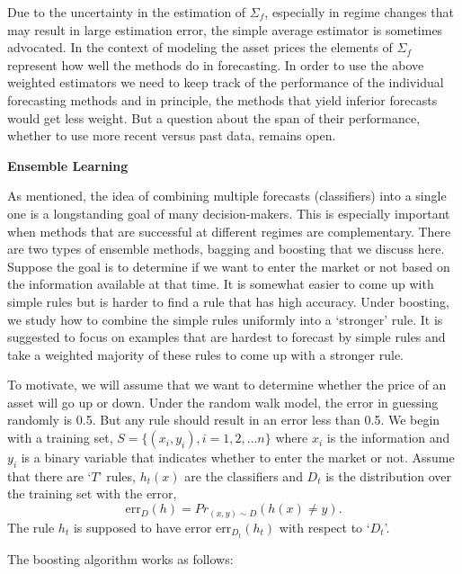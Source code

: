 \noindent Due to the uncertainty in the estimation of $\Sigma_f$, especially in regime changes that may result in large estimation error, the simple average estimator is sometimes advocated. In the context of modeling the asset prices the elements of $\Sigma_f$ represent how well the methods do in forecasting. In order to use the above weighted estimators we need to keep track of the performance of the individual forecasting methods and in principle, the methods that yield inferior forecasts would get less weight. But a question about the span of their performance, whether to use more recent versus past data, remains open. \twomedskip


\noindent \textbf{Ensemble Learning} \twomedskip


As mentioned, the idea of combining multiple forecasts (classifiers) into a single one is a longstanding goal of many decision-makers. This is especially important when methods that are successful at different regimes are complementary. There are two types of ensemble methods, bagging and boosting that we discuss here. Suppose the goal is to determine if we want to enter the market or not based on the information available at that time. It is somewhat easier to come up with simple rules but is harder to find a rule that has high accuracy. Under boosting, we study how to combine the simple rules uniformly into a `stronger' rule. It is suggested to focus on examples that are hardest to forecast by simple rules and take a weighted majority of these rules to come up with a stronger rule.


To motivate, we will assume that we want to determine whether the price of an asset will go up or down. Under the random walk model, the error in guessing randomly is 0.5. But any rule should result in an error less than 0.5. We begin with a training set, $S=\{ (x_i,y_i), i=1,2, \ldots n\}$ where $x_i$ is the information and $y_i$ is a binary variable that indicates whether to enter the market or not. Assume that there are `$T$' rules, $h_t(x)$ are the classifiers and $D_t$ is the distribution over the training set with the error,
	\begin{equation}
	\text{err}_D(h)=Pr_{(x,y) \sim D}(h(x) \neq y).
	\end{equation}
The rule $h_t$ is supposed to have error $\text{err}_{D_t}(h_t)$ with respect to `$D_t$'. \twomedskip


\noindent The boosting algorithm works as follows:


